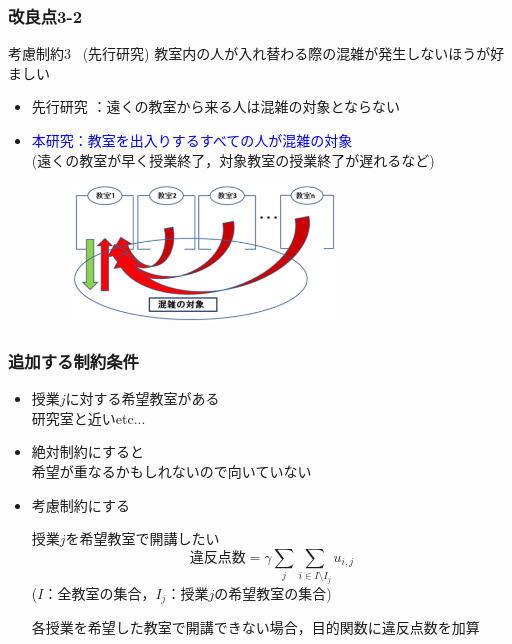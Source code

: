 \documentclass[dvipdfmx,12pt]{beamer}
\begin{document}
\begin{frame}\frametitle{改良点3-2}
\begin{itembox}[l]{考慮制約3 \ (先行研究)}
教室内の人が入れ替わる際の混雑が発生しないほうが好ましい\\
\vspace{-15pt}
\end{itembox}
\vspace{-15pt}
\begin{itemize}
\item 先行研究 ：遠くの教室から来る人は混雑の対象とならない\\
\item \textcolor{blue}{本研究：教室を出入りするすべての人が混雑の対象}\\
(遠くの教室が早く授業終了，対象教室の授業終了が遅れるなど)\\

\begin{figure}

		\includegraphics[width=7cm]{kouryo3_new8.eps}
	
\end{figure}
\end{itemize}
\end{frame}


\begin{frame}\frametitle{追加する制約条件}
\begin{itemize}

\item 授業$j$に対する希望教室がある　\\
研究室と近いetc...\\
\item 絶対制約にすると\\
希望が重なるかもしれないので向いていない\\
\item 考慮制約にする

\begin{block}{授業$j$を希望教室で開講したい}
\[\text{違反点数} = \gamma \sum_j\sum_{i \in I \setminus I_j}u_{i,j} \]
\qquad \qquad ($I$：全教室の集合，$I_j$：授業$j$の希望教室の集合)
\end{block}
各授業を希望した教室で開講できない場合，目的関数に違反点数を加算

\end{itemize}
\end{frame}
\end{document}
